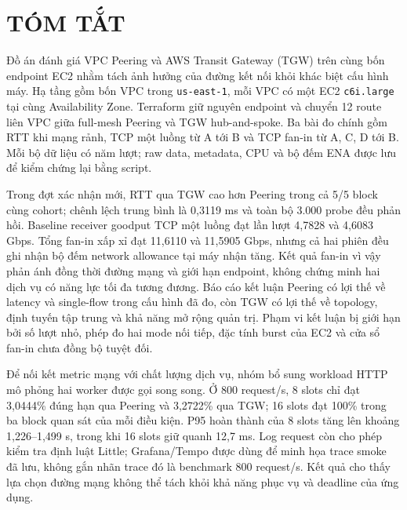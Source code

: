 \chapter*{TÓM TẮT}

Đồ án đánh giá VPC Peering và AWS Transit Gateway (TGW) trên cùng bốn
endpoint EC2 nhằm tách ảnh hưởng của đường kết nối khỏi khác biệt cấu hình
máy. Hạ tầng gồm bốn VPC trong \texttt{us-east-1}, mỗi VPC có một EC2
\texttt{c6i.large} tại cùng Availability Zone. Terraform giữ nguyên endpoint
và chuyển 12 route liên VPC giữa full-mesh Peering và TGW hub-and-spoke.
Ba bài đo chính gồm RTT khi mạng rảnh, TCP một luồng từ A tới B và TCP fan-in
từ A, C, D tới B. Mỗi bộ dữ liệu có năm lượt; raw data, metadata, CPU và bộ
đếm ENA được lưu để kiểm chứng lại bằng script.

Trong đợt xác nhận mới, RTT qua TGW cao hơn Peering trong cả 5/5 block cùng
cohort; chênh lệch trung bình là 0,3119 ms và toàn bộ 3.000 probe đều phản hồi.
Baseline receiver goodput TCP một luồng đạt lần lượt
4,7828 và 4,6083 Gbps. Tổng fan-in xấp xỉ đạt 11,6110 và 11,5905 Gbps,
nhưng cả hai phiên đều ghi nhận bộ đếm network allowance tại máy nhận tăng.
Kết quả fan-in vì vậy phản ánh đồng thời đường mạng và giới hạn endpoint,
không chứng minh hai dịch vụ có năng lực tối đa tương đương. Báo cáo kết luận
Peering có lợi thế về latency và single-flow trong cấu hình đã đo, còn TGW có
lợi thế về topology, định tuyến tập trung và khả năng mở rộng quản trị. Phạm
vi kết luận bị giới hạn bởi số lượt nhỏ, phép đo hai mode nối tiếp, đặc tính
burst của EC2 và cửa sổ fan-in chưa đồng bộ tuyệt đối.

Để nối kết metric mạng với chất lượng dịch vụ, nhóm bổ sung workload HTTP mô
phỏng hai worker được gọi song song. Ở 800 request/s, 8 slots chỉ đạt 3,0444\%
đúng hạn qua Peering và 3,2722\% qua TGW; 16 slots đạt 100\% trong ba block quan
sát của mỗi điều kiện. P95 hoàn thành của 8 slots tăng lên khoảng
1,226--1,499 s, trong khi 16 slots giữ quanh 12,7 ms. Log request còn cho phép
kiểm tra định luật Little; Grafana/Tempo được dùng để minh họa trace smoke đã
lưu, không gắn nhãn trace đó là benchmark 800 request/s. Kết quả cho thấy lựa
chọn đường mạng không thể tách khỏi khả năng phục vụ và deadline của ứng dụng.
